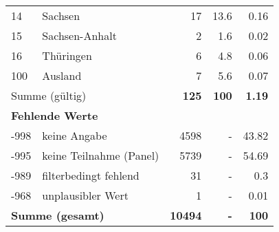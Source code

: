 \begin{longtable}{lXrrr}
     14 &
     \multicolumn{1}{X}{ Sachsen   } &


       \num{17} &
       \num[round-mode=places,round-precision=2]{13,6} &
         \num[round-mode=places,round-precision=2]{0,16} \\

     15 &
     \multicolumn{1}{X}{ Sachsen-Anhalt   } &


       \num{2} &
       \num[round-mode=places,round-precision=2]{1,6} &
         \num[round-mode=places,round-precision=2]{0,02} \\

     16 &
     \multicolumn{1}{X}{ Thüringen   } &


       \num{6} &
       \num[round-mode=places,round-precision=2]{4,8} &
         \num[round-mode=places,round-precision=2]{0,06} \\

     100 &
     \multicolumn{1}{X}{ Ausland   } &


       \num{7} &
       \num[round-mode=places,round-precision=2]{5,6} &
         \num[round-mode=places,round-precision=2]{0,07} \\
     \midrule
     \multicolumn{2}{l}{Summe (gültig)} &
       \textbf{\num{125}} &
     \textbf{100} &
       \textbf{\num[round-mode=places,round-precision=2]{1,19}} \\
     \multicolumn{5}{l}{\textbf{Fehlende Werte}}\\
       -998 &
       keine Angabe &
         \num{4598} &
        - &
         \num[round-mode=places,round-precision=2]{43,82} \\
       -995 &
       keine Teilnahme (Panel) &
         \num{5739} &
        - &
         \num[round-mode=places,round-precision=2]{54,69} \\
       -989 &
       filterbedingt fehlend &
         \num{31} &
        - &
         \num[round-mode=places,round-precision=2]{0,3} \\
       -968 &
       unplausibler Wert &
         \num{1} &
        - &
         \num[round-mode=places,round-precision=2]{0,01} \\
     \midrule
     \multicolumn{2}{l}{\textbf{Summe (gesamt)}} &
          \textbf{\num{10494}} &
        \textbf{-} &
        \textbf{100} \\
     \bottomrule
     \end{longtable}
     
